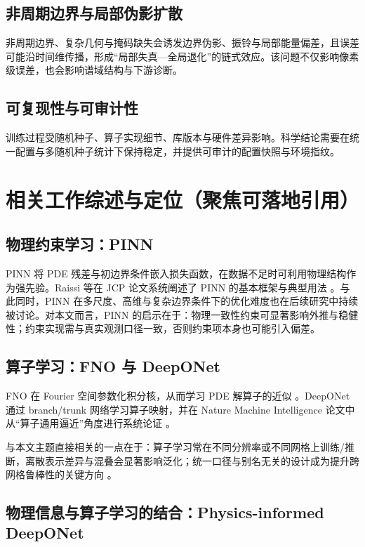 \subsection{非周期边界与局部伪影扩散}

非周期边界、复杂几何与掩码缺失会诱发边界伪影、振铃与局部能量偏差，且误差可能沿时间维传播，形成“局部失真—全局退化”的链式效应。该问题不仅影响像素级误差，也会影响谱域结构与下游诊断。

\subsection{可复现性与可审计性}

训练过程受随机种子、算子实现细节、库版本与硬件差异影响。科学结论需要在统一配置与多随机种子统计下保持稳定，并提供可审计的配置快照与环境指纹。

\section{相关工作综述与定位（聚焦可落地引用）}

\subsection{物理约束学习：PINN}

PINN 将 PDE 残差与初边界条件嵌入损失函数，在数据不足时可利用物理结构作为强先验。Raissi 等在 JCP 论文系统阐述了 PINN 的基本框架与典型用法 \parencite{raissi2019pinn}。与此同时，PINN 在多尺度、高维与复杂边界条件下的优化难度也在后续研究中持续被讨论。对本文而言，PINN 的启示在于：物理一致性约束可显著影响外推与稳健性；约束实现需与真实观测口径一致，否则约束项本身也可能引入偏差。

\subsection{算子学习：FNO 与 DeepONet}

FNO 在 Fourier 空间参数化积分核，从而学习 PDE 解算子的近似 \parencite{li2021fno}。DeepONet 通过 branch/trunk 网络学习算子映射，并在 Nature Machine Intelligence 论文中从“算子通用逼近”角度进行系统论证 \parencite{lu2021deeponet}。

与本文主题直接相关的一点在于：算子学习常在不同分辨率或不同网格上训练/推断，离散表示差异与混叠会显著影响泛化；统一口径与别名无关的设计成为提升跨网格鲁棒性的关键方向 \parencite{kovachki2023neural_operator,bartolucci2023reno}。

\subsection{物理信息与算子学习的结合：Physics-informed DeepONet}

